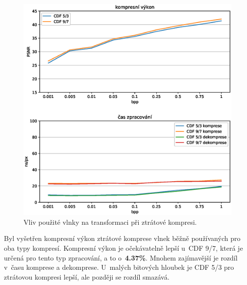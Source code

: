 \begin{figure}[hbt!]
  \centering
  \hspace*{-0.75cm}
  \includegraphics[width=16cm]{obrazky-figures/waves/fotky_waves.eps}
  \caption{Vliv použité vlnky na transformaci při ztrátové kompresi.}
\end{figure}
\noindent Byl vyšetřen kompresní výkon ztrátové komprese vlnek běžně používaných pro oba typy kompresí. Kompresní výkon je očekávatelně lepší u~CDF 9/7, která je určená pro tento typ zpracování, a to o~\textbf{4.37\%}. Mnohem zajímavější je rozdíl v~času komprese a dekomprese. U~malých bitových hloubek je CDF 5/3 pro ztrátovou kompresi lepší, ale později se rozdíl smazává.



